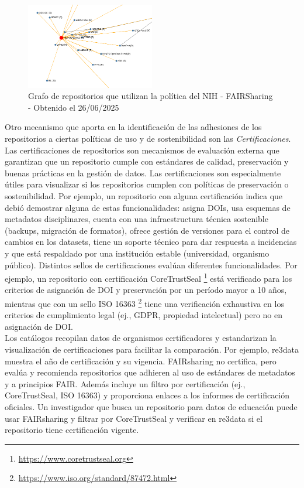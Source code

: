 \documentclass[runningheads]{llncs}
\begin{document}
\begin{figure}[h]
    \includegraphics[width=0.5\textwidth]{img/FAIRSharing_NIHPol_Repos.png}
    \caption{
    Grafo de repositorios que utilizan la política del NIH - FAIRSharing - Obtenido el 26/06/2025
    }
    \label{fig:fairsharing_nih_policy_repo_usages}
\end{figure}

Otro mecanismo que aporta en la identificación de las adhesiones de los repositorios a ciertas políticas de uso y de sostenibilidad son las \emph{Certificaciones}. Las certificaciones de repositorios son mecanismos de evaluación externa que garantizan que un repositorio cumple con estándares de calidad, preservación y buenas prácticas en la gestión de datos. Las certificaciones son especialmente útiles para visualizar si los repositorios cumplen con políticas de preservación o sostenibilidad. Por ejemplo, un repositorio con alguna certificación indica que debió demostrar alguna de estas funcionalidades: asigna DOIs, usa esquemas de metadatos disciplinares,  cuenta con una infraestructura técnica sostenible (backups, migración de formatos), ofrece gestión de versiones para el control de cambios en los datasets, tiene un soporte técnico para dar respuesta a incidencias y que está respaldado por una institución estable (universidad, organismo público). Distintos sellos de certificaciones evalúan diferentes funcionalidades. Por ejemplo, un repositorio con certificación CoreTrustSeal \footnote{\url{https://www.coretrustseal.org}} está verificado para los criterios de asignación de DOI y preservación por un período mayor a 10 años, mientras que con un sello ISO 16363 \footnote{\url{https://www.iso.org/standard/87472.html}} tiene una verificación exhaustiva en los criterios de cumplimiento legal (ej., GDPR, propiedad intelectual) pero no en asignación de DOI.\\


Los catálogos recopilan datos de organismos certificadores y estandarizan la visualización de certificaciones para facilitar la comparación. Por ejemplo, re3data muestra el año de certificación y su vigencia.  FAIRsharing no certifica, pero evalúa y recomienda repositorios que adhieren al uso de estándares de metadatos y a principios FAIR. Además incluye un filtro por certificación (ej., CoreTrustSeal, ISO 16363) y proporciona enlaces a los informes de certificación oficiales. Un investigador que busca un repositorio para datos de educación puede usar FAIRsharing y filtrar por CoreTrustSeal y verificar en re3data si el repositorio tiene certificación vigente.
\end{document}
